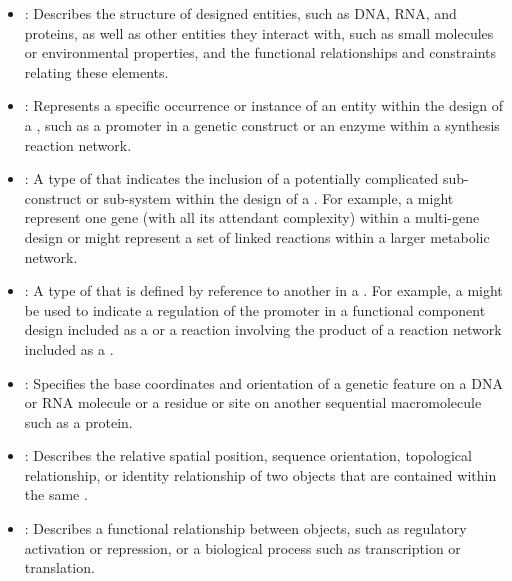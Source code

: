 \begin{itemize}

\item \emph{}: Describes the structure of designed entities, such as DNA, RNA, and proteins, as well as other entities they interact with, such as small molecules or environmental properties, and the functional relationships and constraints relating these elements.

\item \emph{}:
Represents a specific occurrence or instance of an entity within the design of a , such as a promoter in a genetic construct or an enzyme within a synthesis reaction network.

\item \emph{}:
A type of  that indicates the inclusion of a potentially complicated sub-construct or sub-system within the design of a . For example, a  might represent one gene (with all its attendant complexity) within a multi-gene design or might represent a set of linked reactions within a larger metabolic network.

\item \emph{}:
A type of  that is defined by reference to another  in a . For example, a  might be used to indicate a regulation of the promoter in a functional component design included as a  or a reaction involving the product of a reaction network included as a .


\item \emph{}:
Specifies the base coordinates and orientation of a genetic feature on a DNA or RNA molecule or a residue or site on another sequential macromolecule such as a protein.


\item \emph{}:
Describes the relative spatial position, sequence orientation, topological relationship, or identity relationship of two  objects that are contained within the same .

\item \emph{}:
Describes a functional relationship between  objects, such as regulatory activation or repression, or a biological process such as transcription or translation.


\end{itemize}
